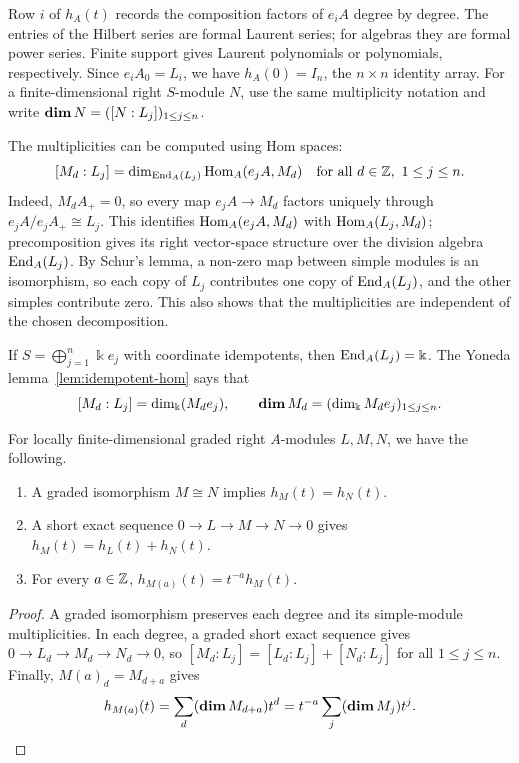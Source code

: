 Row $i$ of $h_A(t)$ records the composition factors of $e_iA$ degree by degree.
The entries of the Hilbert series are formal Laurent series; for algebras they are formal power series.
Finite support gives Laurent polynomials or polynomials, respectively.
Since $e_iA_0=L_i$, we have $h_A(0)=I_n$, the $n\times n$ identity array.
For a finite-dimensional right $S$-module $N$, use the same multiplicity notation and write $\operatorname{\mathbf{dim}} N=([N:L_j])_{1\leq j\leq n}$.

The multiplicities can be computed using Hom spaces:
\begin{equation}\label{eq:composition-Hom}
[M_d:L_j]=\dim_{\operatorname{End}\nolimits_A(L_j)}\operatorname{Hom}\nolimits_A(e_jA,M_d)
\quad\text{for all }d\in\mathbb{Z},\ 1\leq j\leq n.
\end{equation}
Indeed, $M_dA_+=0$, so every map $e_jA\to M_d$ factors uniquely through $e_jA/e_jA_+\cong L_j$.
This identifies $\operatorname{Hom}\nolimits_A(e_jA,M_d)$ with $\operatorname{Hom}\nolimits_A(L_j,M_d)$; precomposition gives its right vector-space structure over the division algebra $\operatorname{End}\nolimits_A(L_j)$.
By Schur's lemma, a non-zero map between simple modules is an isomorphism, so each copy of $L_j$ contributes one copy of $\operatorname{End}\nolimits_A(L_j)$, and the other simples contribute zero.
This also shows that the multiplicities are independent of the chosen decomposition.

\begin{example}\label{ex:dimension-vector-coordinate}
If $S=\bigoplus_{j=1}^n\Bbbk e_j$ with coordinate idempotents, then $\operatorname{End}\nolimits_A(L_j)=\Bbbk$.
The Yoneda lemma~\ref{lem:idempotent-hom} says that 
\[
[M_d:L_j]=\dim_\Bbbk(M_de_j),
\qquad \operatorname{\mathbf{dim}} M_d=(\dim_\Bbbk M_de_j)_{1\leq j\leq n}.
\]
\end{example}

\begin{lemma}\label{lem:hilbert-operations}
For locally finite-dimensional graded right $A$-modules $L,M,N$, we have the following.
\begin{enumerate}
\item A graded isomorphism $M\cong N$ implies $h_M(t)=h_N(t)$.
\item A short exact sequence $0\to L\to M\to N\to0$ gives $h_M(t)=h_L(t)+h_N(t)$.
\item For every $a\in\mathbb{Z}$, $h_{M(a)}(t)=t^{-a}h_M(t)$.
\end{enumerate}
\end{lemma}

\begin{proof}
A graded isomorphism preserves each degree and its simple-module multiplicities.
In each degree, a graded short exact sequence gives $0\to L_d\to M_d\to N_d\to0$, so $[M_d:L_j]=[L_d:L_j]+[N_d:L_j]$ for all $1\leq j\leq n$.
Finally, $M(a)_d=M_{d+a}$ gives
\[
h_{M(a)}(t)=\sum_d(\operatorname{\mathbf{dim}} M_{d+a})t^d
=t^{-a}\sum_j(\operatorname{\mathbf{dim}} M_j)t^j.\qedhere
\]
\end{proof}

